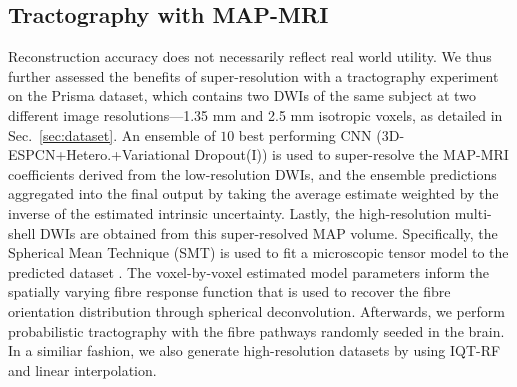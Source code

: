 \subsection{Tractography with MAP-MRI}
Reconstruction accuracy does not necessarily reflect real world utility. We thus further assessed the benefits of super-resolution with a tractography experiment on the Prisma dataset, which contains two DWIs of the same subject at two different image resolutions---1.35 mm and 2.5 mm isotropic voxels, as detailed in Sec.~\ref{sec:dataset}. An ensemble of $10$ best performing CNN (3D-ESPCN+Hetero.+Variational Dropout(I)) is used to super-resolve the MAP-MRI coefficients \cite{ozarslan2013mean} derived from the low-resolution DWIs, and the ensemble predictions aggregated into the final output by taking the average estimate weighted by the inverse of the estimated intrinsic uncertainty. Lastly, the high-resolution multi-shell DWIs are obtained from this super-resolved MAP volume. Specifically, the Spherical Mean Technique (SMT) is used to fit a microscopic tensor model to the predicted dataset \cite{kaden2016quantitative}. The voxel-by-voxel estimated model parameters inform the spatially varying fibre response function that is used to recover the fibre orientation distribution through spherical deconvolution. Afterwards, we perform probabilistic tractography \cite{tournier2010improved} with the fibre pathways randomly seeded in the brain. In a similiar fashion, we also generate high-resolution datasets by using IQT-RF and linear interpolation.


